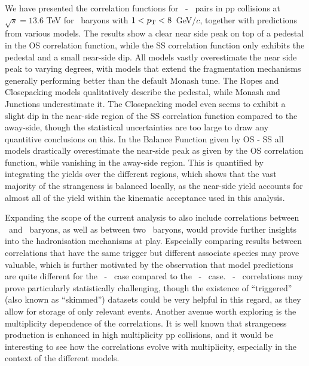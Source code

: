   We have presented the correlation functions for \Xi\ - \Xi\ pairs in pp collisions at $\sqrt{s} = 13.6$ TeV for \Xi\ baryons with $1 < p_{\text{T}} < 8$~GeV/$c$, together with predictions from various models. The results show a clear near side peak on top of a pedestal in the OS correlation function, while the SS correlation function only exhibits the pedestal and a small near-side dip. All models vastly overestimate the near side peak to varying degrees, with models that extend the fragmentation mechanisms generally performing better than the default Monash tune. The Ropes and Closepacking models qualitatively describe the pedestal, while Monash and Junctions underestimate it. The Closepacking model even seems to exhibit a slight dip in the near-side region of the SS correlation function compared to the away-side, though the statistical uncertainties are too large to draw any quantitive conclusions on this. In the Balance Function given by OS - SS all models drastically overestimate the near-side peak as given by the OS correlation function, while vanishing in the away-side region. This is quantified by integrating the yields over the different regions, which shows that the vast majority of the strangeness is balanced locally, as the near-side yield accounts for almost all of the yield within the kinematic acceptance used in this analysis. 

  Expanding the scope of the current analysis to also include correlations between \Xi\ and \Omega\ baryons, as well as between two \Omega\ baryons, would provide further insights into the hadronisation mechanisms at play. Especially comparing results between correlations that have the same trigger but different associate species may prove valuable, which is further motivated by the observation that model predictions are quite different for the \Xi\ - \Omega\ case compared to the \Xi\ - \Xi\ case. \Omega\ - \Omega\ correlations may prove particularly statistically challenging, though the existence of ``triggered'' (also known as ``skimmed'') datasets could be very helpful in this regard, as they allow for storage of only relevant events. Another avenue worth exploring is the multiplicity dependence of the correlations. It is well known that strangeness production is enhanced in high multiplicity pp collisions, and it would be interesting to see how the correlations evolve with multiplicity, especially in the context of the different models. 

